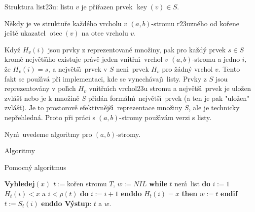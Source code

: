 \documentclass[a4paper,12pt]{article}
\DeclareMathOperator*{\otec}{otec}
\DeclareMathOperator*{\key}{key}
\begin{document}
\flushpar Struktura list\accent23u:\newline 
listu $v$ je p\v ri\v razen prvek $\key(v)\in S$.
\medskip

\flushpar N\v ekdy je ve struktu\v re ka\v zd\'eho vrcholu $v$ 
$(a,b)$-stromu r\accent23uzn\'eho od ko\v rene je\v st\v e ukazatel 
$\otec(v)$ na otce vrcholu $v$.
\medskip

\flushpar Kdy\v z $H_v(i)$ jsou prvky z reprezentovan\'e 
mno\v ziny, pak pro ka\v zd\'y prvek $s\in S$ krom\v e nejv\v et\v s\'\i ho 
existuje pr\'av\v e jeden vnit\v r\-n\'\i\ vrchol $v$ $(a,b)$-stromu 
a jedno $i$, \v ze $H_v(i)=s$, a nejv\v et\v s\'\i\ prvek v $S$ nen\'\i\ prvek 
$H_v$ pro \v z\'adn\'y vrchol $v$. Tento fakt se pou\v z\'\i v\'a p\v ri 
implementaci, kde se vynech\'avaj\'\i\ listy. Prvky z $S$ jsou 
reprezentov\'any v pol\'\i ch $H_v$ vnit\v r\-n\'\i ch vrchol\accent23u 
stromu 
a nejv\v et\v s\'\i\ prvek je ulo\v zen zvl\'a\v s\v t nebo je k mno\v zin\v e $S$ p\v rid\'an 
form\'aln\'\i\ nejv\v et\v s\'\i\ prvek (a ten je pak "ulo\v zen" zvl\'a\v s\v t). Je to prostorov\v e 
efektivn\v ej\v s\'\i\ reprezentace mno\v ziny $S$, ale je technicky 
nep\v rehledn\'a. Proto p\v ri pr\'aci s $(a,b)$-stromy pou\v z\'\i v\'am 
verzi s listy.
\medskip

\flushpar Nyn\'\i\ uvedeme algoritmy pro $(a,b)$-stromy.

\subhead 
Algoritmy
\endsubhead

\flushpar Pomocn\'y algoritmus
\bigskip

{\bf Vyhledej$(x)$\newline 
$t:=$}ko\v ren stromu $T$, $w:=NIL$\newline 
{\bf while} $t$ nen\'\i\ list {\bf do}\newline 
\phantom{---}$i:=1$\newline 
\phantom{---}{\bf while} $H_t(i)<x$ a $i<\rho (t)$ {\bf do} $i:=i+1$ {\bf enddo}\newline 
\phantom{---}{\bf if} $H_t(i)=x$ {\bf then} $w:=t$ {\bf endif}\newline 
$t:=S_t(i)$ {\bf enddo V\'ystup}: $t$ a $w$.
\medskip
\end{document}
